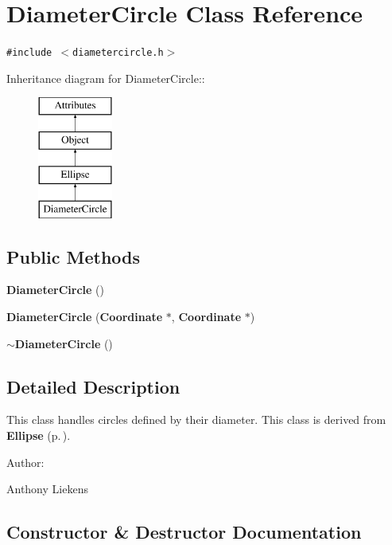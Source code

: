 \section{Diameter\-Circle Class Reference}
\label{classDiameterCircle}
{\tt \#include $<$diametercircle.h$>$}

Inheritance diagram for Diameter\-Circle::\begin{figure}[H]
\begin{center}
\leavevmode
\includegraphics[height=4cm]{classDiameterCircle}
\end{center}
\end{figure}
\subsection*{Public Methods}
\begin{CompactItemize}
\item 
{\bf Diameter\-Circle} ()
\item 
{\bf Diameter\-Circle} ({\bf Coordinate} $\ast$, {\bf Coordinate} $\ast$)
\item 
{\bf $\sim$Diameter\-Circle} ()
\end{CompactItemize}


\subsection{Detailed Description}
This class handles circles defined by their diameter. This class is derived from {\bf Ellipse} {\rm (p.\,\pageref{classEllipse})}. \begin{Desc}
\item[Author: ]\par
Anthony Liekens \end{Desc}




\subsection{Constructor \& Destructor Documentation}
